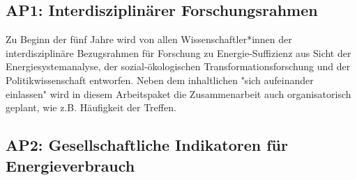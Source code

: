 \documentclass[a4paper,11pt,twoside]{scrartcl}
\begin{document}
\subsection*{AP1: Interdisziplinärer Forschungsrahmen}
Zu Beginn der fünf Jahre wird von allen Wissenschaftler*innen der interdisziplinäre Bezugsrahmen für Forschung zu Energie-Suffizienz aus Sicht der Energiesystemanalyse, der sozial-ökologischen Transformationsforschung und der Politikwissenschaft entworfen. Neben dem inhaltlichen "sich aufeinander einlassen" wird in diesem Arbeitspaket die Zusammenarbeit auch organisatorisch geplant, wie z.B. Häufigkeit der Treffen.

\subsection*{AP2: Gesellschaftliche Indikatoren für Energieverbrauch}
\end{document}
